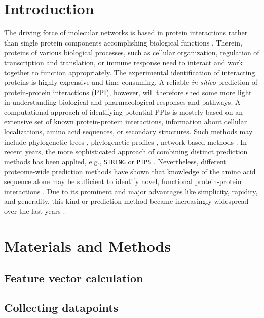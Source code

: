 \documentclass[preprint,3p,times,twocolumn]{elsarticle}
\begin{document}
\section{Introduction}
The driving force of molecular networks is based in protein
interactions rather than single protein components accomplishing
biological functions \cite{Pawson:2004}. Therein, proteins of various
biological processes, such as cellular organization, regulation of
transcription and translation, or immune response need to interact and
work together to function appropriately. The experimental
identification of interacting proteins is highly expensive and time
consuming. A reliable \textit{in silico} prediction of protein-protein
interactions (PPI), however, will therefore shed some more
light in understanding biological and pharmacological responses and pathways. A
computational approach of identifying potential PPIs is mostely based
on an extensive set of known protein-protein interactions, information
about cellular localizations, amino acid sequences, or secondary
structures. Such methods may include phylogenetic trees
\cite{Pazos:2001}, phylogenetic profiles \cite{Barker:2005},
network-based methods \cite{Yook:2004, Clauset:2008}. In recent years,
the more sophisticated approach of combining distinct prediction
methods has been applied, e.g., \texttt{STRING} \cite{Szklarczyk:2011}
or \texttt{PIPS} \cite{McDowall:2009}. Nevertheless, different proteome-wide prediction methods have shown
that knowledge of the amino acid sequence alone may be sufficient to identify novel,
functional protein-protein interactions \cite{Martin:2005,
  Shen:2007}. Due to its prominent and major advantages like simplicity, rapidity,
and generality, this kind or prediction method became increasingly
widespread over the last years \cite{Ofran:2003, Betel:2007, Liu:2012, Perovic:2017, Pan:2010}.


\section{Materials and Methods}
\subsection{Feature vector calculation}

\subsection{Collecting datapoints}
\end{document}
